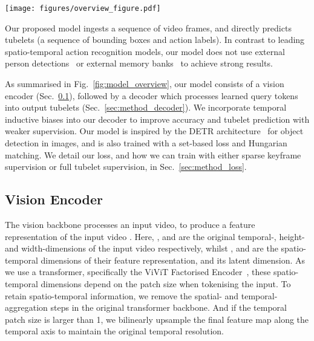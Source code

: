 \documentclass[10pt,twocolumn,letterpaper]{article}
\begin{document}
\begin{figure*}[t]
	\vspace{-1.5\baselineskip}
	\texttt{[image: figures/overview\_figure.pdf]}
	\caption{
	Our model processes a fixed-length video clip, and for each frame, outputs tubelets (\ie linked bounding boxes with associated action class probabilities).
	It consists of a transformer-based vision encoder which outputs a video representation, .
	The video representation, along with learned queries,  (which are factorised into spatial  and temporal components ) are decoded into tubelets by a decoder of  layers followed by shallow box and class prediction heads.
	}
 	\vspace{-\baselineskip}
	\label{fig:model_overview}
\end{figure*} 
Our proposed model ingests a sequence of video frames, and directly predicts tubelets (a sequence of bounding boxes and action labels). In contrast to leading spatio-temporal action recognition models, our model does not use external person detections~\cite{pan2021actor, arnab2022beyond, tong2022videomae, wu2022memvit} or external memory banks~\cite{wu_cvpr_2019, zhao2022tuber, pan2021actor} to achieve strong results.

As summarised in Fig.~\ref{fig:model_overview}, our model consists of a vision encoder (Sec.~\ref{sec:method_vision_encoder}), followed by a decoder which processes learned query tokens into output tubelets (Sec.~\ref{sec:method_decoder}).
We incorporate temporal inductive biases into our decoder to improve accuracy and tubelet prediction with weaker supervision. Our model is inspired by the DETR architecture~\cite{carion_eccv_2020} for object detection in images, and is also trained with a set-based loss and Hungarian matching.
We detail our loss, and how we can train with either sparse keyframe supervision or full tubelet supervision, in Sec.~\ref{sec:method_loss}.




\subsection{Vision Encoder}
\label{sec:method_vision_encoder}

The vision backbone processes an input video,  to produce a feature representation of the input video .
Here, ,  and  are the original temporal-, height- and width-dimensions of the input video respectively, whilst ,  and  are the spatio-temporal dimensions of their feature representation, and  its latent dimension.
As we use a transformer, specifically the ViViT Factorised Encoder~\cite{arnab2021vivit}, these spatio-temporal dimensions depend on the patch 
size when tokenising the input.
To retain spatio-temporal information, we remove the spatial- and temporal-aggregation steps in the original transformer backbone.
And if the temporal patch size is larger than 1, we bilinearly upsample the final feature map along the temporal axis to maintain the original temporal resolution.
\end{document}
